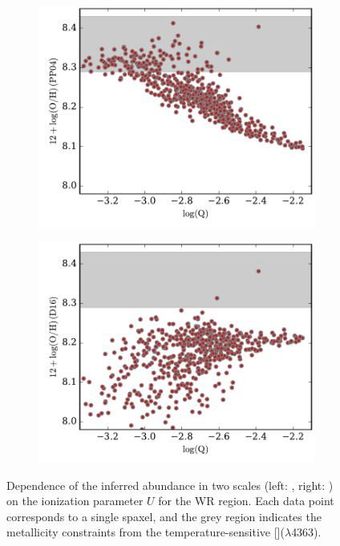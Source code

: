 \documentclass[traditabstract]{aa}
\newcommand{\oiii}{[\ion{O}{iii}]}
\begin{document}
\begin{appendix}
\begin{figure}
\begin{subfigure}{.24\textwidth}
  \includegraphics[width=0.999\linewidth]{Figs/QO3N2.pdf}
\end{subfigure}
\begin{subfigure}{.24\textwidth}
  \includegraphics[width=0.999\linewidth]{Figs/QS2.pdf}
\end{subfigure}\caption{Dependence of the inferred abundance in two scales (left: \citealt{2004MNRAS.348L..59P}, right: \citealt{2016Ap&SS.361...61D}) on the ionization parameter $U$ for the WR region. Each data point corresponds to a single spaxel, and the grey region indicates the metallicity constraints from the temperature-sensitive \oiii($\lambda$4363).}
\label{fig:UO3}
\end{figure}


\end{appendix}
\end{document}
